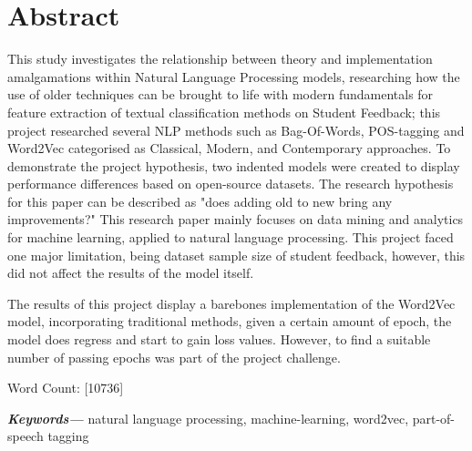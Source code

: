 \documentclass[12pt, a4paper]{report}
\providecommand{\keywords}[1]
{
  \small
  \textbf{\textit{Keywords---}} #1
}
\begin{document}
\chapter*{Abstract}	%


This study investigates the relationship between theory and implementation amalgamations within Natural Language Processing models, researching how the use of older techniques can be brought to life with modern fundamentals for feature extraction of textual classification methods on Student Feedback; this project researched several NLP methods such as Bag-Of-Words, POS-tagging and Word2Vec categorised as Classical, Modern, and Contemporary approaches. To demonstrate the project hypothesis, two indented models were created to display performance differences based on open-source datasets. The research hypothesis for this paper can be described as "does adding old to new bring any improvements?" This research paper mainly focuses on data mining and analytics for machine learning, applied to natural language processing. This project faced one major limitation, being dataset sample size of student feedback, however, this did not affect the results of the model itself.

The results of this project display a barebones implementation of the Word2Vec model, incorporating traditional methods, given a certain amount of epoch, the model does regress and start to gain loss values. However, to find a suitable number of passing epochs was part of the project challenge.


Word Count: [10736]


\indent \keywords{natural language processing, machine-learning, word2vec, part-of-speech tagging}

\newpage
\renewcommand{\contentsname}{Table of Contents}	%
\tableofcontents

\newpage
{}	%
\listoftables

\newpage
{}	%
\listoffigures
\end{document}
